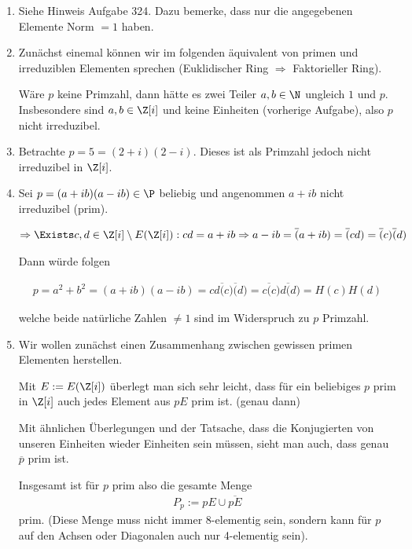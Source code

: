 \begin{solution}

\begin{enumerate}
  \item Siehe Hinweis Aufgabe 324. Dazu bemerke, dass nur die angegebenen Elemente Norm $= 1$ haben.

  \item Zunächst einemal können wir im folgenden äquivalent von primen und irreduziblen Elementen sprechen (Euklidischer Ring $\Rightarrow$ Faktorieller Ring).

  Wäre $p$ keine Primzahl, dann hätte es zwei Teiler $a,b \in \N$ ungleich $1$ und $p$. Insbesondere sind $a,b \in \Z [i]$ und keine Einheiten (vorherige Aufgabe), also $p$ nicht irreduzibel.

  \item Betrachte $p = 5 = (2+i)(2-i)$. Dieses ist als Primzahl jedoch nicht irreduzibel in $\Z [i]$.

  \item Sei $p = (a+ib)(a-ib) \in \P$ beliebig und angenommen $a+ib$ nicht irreduzibel (prim).

  \begin{align*}
    \Rightarrow \Exists c,d \in \Z [i] \setminus E(\Z [i]):  cd = a+ib \Rightarrow a - ib = \overline(a+ib) = \overline(cd) = \overline(c) \overline(d)
  \end{align*}

  Dann würde folgen

  \begin{align*}
    p = a^2 + b^2 = (a+ib)(a-ib) = cd\overline(c) \overline(d) = c\overline(c)d \overline(d) = H(c)H(d)
  \end{align*}

  welche beide natürliche Zahlen $\neq 1$ sind im Widerspruch zu $p$ Primzahl.

  \item Wir wollen zunächst einen Zusammenhang zwischen gewissen primen Elementen herstellen.

  Mit $E:= E(\Z [i])$ überlegt man sich sehr leicht, dass für ein beliebiges $p$ prim in $\Z [i]$ auch jedes Element aus $pE$ prim ist. (genau dann)

  Mit ähnlichen Überlegungen und der Tatsache, dass die Konjugierten von unseren Einheiten wieder Einheiten sein müssen, sieht man auch, dass genau $\overline{p}$ prim ist.

  Insgesamt ist für $p$ prim also die gesamte Menge
  \begin{align*}
    P_p := pE \cup \overline{pE}
  \end{align*}
  prim. (Diese Menge muss nicht immer 8-elementig sein, sondern kann für $p$ auf den Achsen oder Diagonalen auch nur 4-elementig sein).


\end{enumerate}
\end{solution}
